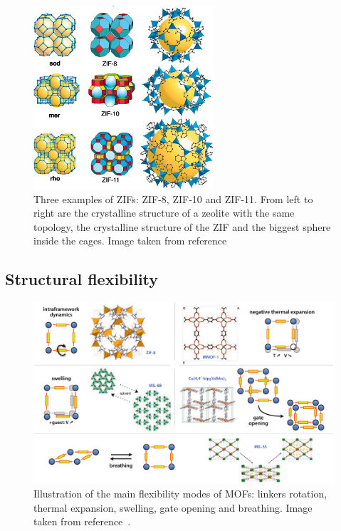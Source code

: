 \documentclass[thesis]{subfiles}
\begin{document}
\begin{figure}[ht]
    \centering
    \includegraphics[width=0.6\textwidth]{figures/images/zif-examples}
    \caption{Three examples of ZIFs: ZIF-8, ZIF-10 and ZIF-11. From left to
    right are the crystalline structure of a zeolite with the same topology,
    the crystalline structure of the ZIF and the biggest sphere inside the
    cages. Image taken from reference~\cite{Park2006}}
    \label{fig:zif-examples}
\end{figure}

\subsection{Structural flexibility}

\begin{figure}[ht]
    \centering
    \includegraphics[width=\textwidth]{figures/images/mof-flexibility}
    \caption{Illustration of the main flexibility modes of MOFs: linkers
    rotation, thermal expansion, swelling, gate opening and breathing. Image
    taken from reference~\cite{Coudert2011}.}
    \label{fig:mof-flexibility}
\end{figure}
\end{document}
